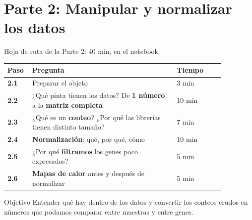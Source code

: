 \section{Parte 2: Manipular y normalizar los datos}

\begin{frame}{Hoja de ruta de la Parte 2: 40 min, en el notebook}
  \small
  \begin{tabular}{@{}p{0.07\linewidth}p{0.6\linewidth}p{0.2\linewidth}@{}}
    \toprule
    \textbf{Paso} & \textbf{Pregunta} & \textbf{Tiempo}\\\midrule
    \textbf{2.1} & Preparar el objeto & 3 min\\[3pt]
    \textbf{2.2} & ¿Qué pinta tienen los datos? De \textbf{1 número} a la \textbf{matriz completa} & 10 min\\[3pt]
    \textbf{2.3} & ¿Qué es un \textbf{conteo}? ¿Por qué las librerías tienen distinto tamaño? & 7 min\\[3pt]
    \textbf{2.4} & \textbf{Normalización}: qué, por qué, cómo & 10 min\\[3pt]
    \textbf{2.5} & ¿Por qué \textbf{filtramos} los genes poco expresados? & 5 min\\[3pt]
    \textbf{2.6} & \textbf{Mapas de calor} antes y después de normalizar & 5 min\\
    \bottomrule
  \end{tabular}
  \vspace{0.3cm}

  \begin{block}{Objetivo}
    Entender qué hay dentro de los datos y convertir los \alert{conteos crudos} en números que podamos \alert{comparar} entre muestras y entre genes.
  \end{block}
\end{frame}

